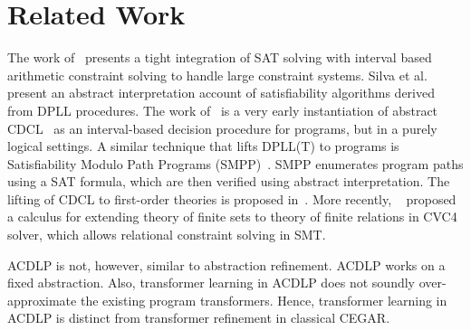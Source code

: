 \section{Related Work}
%
The work of~\cite{franzle} presents a tight integration of SAT solving
with interval based arithmetic constraint solving to handle large constraint
systems. 
%
Silva et al.~\cite{sas12} present an abstract interpretation account of 
satisfiability algorithms derived from DPLL procedures.  
%
The work of~\cite{tacas12} is a very early instantiation of abstract 
CDCL~\cite{sas12} as an interval-based decision procedure for programs, 
but in a purely logical settings.  
%
A similar technique that lifts DPLL(T) to programs is Satisfiability Modulo 
Path Programs (SMPP)~\cite{SMPP}. SMPP enumerates program paths using a SAT 
formula, which are then verified using abstract interpretation.  
%
%
The lifting of CDCL to first-order theories is proposed
in~\cite{dpll,ndsmt,vmcai13}.
%
  More recently, ~\cite{cade17} proposed a calculus for extending theory of
  finite sets to theory of finite relations in CVC4 solver, which allows
  relational constraint solving in SMT.  
  
  ACDLP is not, however, similar to abstraction refinement. ACDLP works on a fixed
  abstraction. Also, transformer learning in ACDLP does not soundly over-approximate
  the existing program transformers. 
  Hence, transformer learning in ACDLP is distinct from transformer refinement in classical CEGAR. 

%
%
%
%

